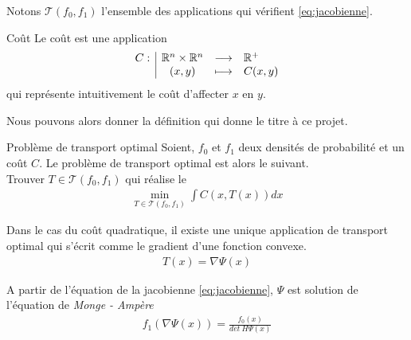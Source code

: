 \documentclass[a4paper,12pt]{article}
\begin{document}
Notons $\mathcal{T}(f_0,f_1)$ l'ensemble des applications qui vérifient \eqref{eq:jacobienne}.

\begin{definition}{Coût}
Le coût est une application 
$$
\begin{array}[t]{l|ccl} C: & \mathbb{R}^n\times\mathbb{R}^n & \longrightarrow & \mathbb{R}^+ \\ & (x,y) & \longmapsto & C(x,y) \end{array}
$$
qui représente intuitivement le coût d'affecter $x$ en $y$.
\end{definition}

Nous pouvons alors donner la définition qui donne le titre à ce projet. 
\begin{definition}{Problème de transport optimal}
Soient, $f_0$ et $f_1$ deux densités de probabilité et un coût $C$. Le problème de transport optimal est alors le suivant.\\
Trouver $T\in\mathcal{T}(f_0,f_1)$ qui réalise le 
\begin{align}
\min_{T\in\mathcal{T}(f_0,f_1)} \int C(x,T(x)) dx
\label{eq:trspOpt}
\end{align}
\end{definition}

\begin{theoreme}{}
Dans le cas du coût quadratique, il existe une unique application de transport optimal qui s'écrit comme le gradient d'une fonction convexe. 
\begin{align}
T(x) = \nabla \Psi(x)
\label{eq:opttrspGrdient}
\end{align}
\end{theoreme}
\begin{preuve}

\end{preuve}
A partir de l'équation de la jacobienne \eqref{eq:jacobienne}, $\Psi$ est solution de l'équation de \emph{Monge - Ampère} 
\begin{align}
f_1(\nabla\Psi(x)) = \frac{f_0(x)}{det\ H\Psi(x)}
\label{eq:mongemapere}
\end{align}
\end{document}
